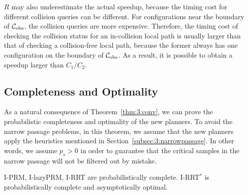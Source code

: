 $R$ may also underestimate the actual speedup, because the timing cost for different collision queries can be different. For configurations near the boundary of $\mathcal C_{\text{obs}}$, the collision queries are more expensive. Therefore, the timing cost of checking the collision status for an in-collision local path is usually larger than that of checking a collision-free local path, because the former always has one configuration on the boundary of $\mathcal C_{\text{obs}}$. As a result, it is possible to obtain a speedup larger than $C_1 / C_2$.

\subsection{Completeness and Optimality}
As a natural consequence of Theorem~\ref{thm:3:conv}, we can prove the probabilistic completeness and optimality of the new planners. To avoid the narrow passage problems, in this theorem, we assume that the new planners apply the heuristics mentioned in Section~\ref{subsec:3:narrowpassage}. In other words, we assume $p_s > 0$ in order to guarantee that the critical samples in the narrow passage will not be filtered out by mistake.
\begin{theorem}
  \label{thm:3:complete}
  I-PRM, I-lazyPRM, I-RRT are probabilistically complete. I-RRT${}^*$ is probabilistically complete and asymptotically optimal.
\end{theorem}
